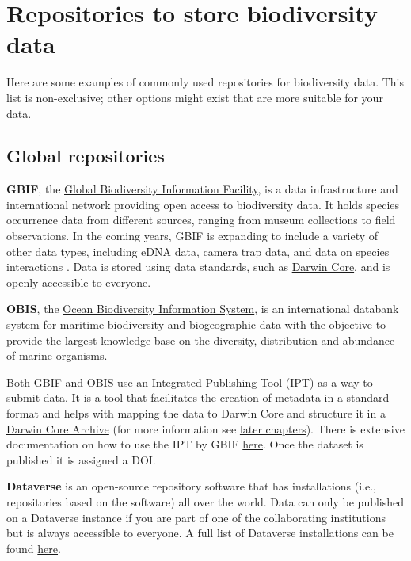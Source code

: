 \documentclass[
  oneside]{book}
\begin{document}
\section{Repositories to store biodiversity data}\label{repositories-to-store-biodiversity-data}

Here are some examples of commonly used repositories for biodiversity data. This list is non-exclusive; other options might exist that are more suitable for your data.

\subsection{Global repositories}\label{global-repositories}

\textbf{GBIF}, the \href{http://gbif.org}{Global Biodiversity Information Facility}, is a data infrastructure and international network providing open access to biodiversity data. It holds species occurrence data from different sources, ranging from museum collections to field observations. In the coming years, GBIF is expanding to include a variety of other data types, including eDNA data, camera trap data, and data on species interactions \autocite{GBIF_2021}. Data is stored using data standards, such as \hyperref[DwC]{Darwin Core}, and is openly accessible to everyone.

\textbf{OBIS}, the \href{https://obis.org/}{Ocean Biodiversity Information System}, is an international databank system for maritime biodiversity and biogeographic data with the objective to provide the largest knowledge base on the diversity, distribution and abundance of marine organisms.

Both GBIF and OBIS use an Integrated Publishing Tool (IPT) as a way to submit data. It is a tool that facilitates the creation of metadata in a standard format and helps with mapping the data to Darwin Core and structure it in a \hyperref[DwC-A]{Darwin Core Archive} (for more information see \hyperref[darwin-core-archive]{later chapters}). There is extensive documentation on how to use the IPT by GBIF \href{https://ipt.gbif.org/manual/en/ipt/latest/dwca-guide}{here}. Once the dataset is published it is assigned a DOI.

\textbf{Dataverse} is an open-source repository software that has installations (i.e., repositories based on the software) all over the world. Data can only be published on a Dataverse instance if you are part of one of the collaborating institutions but is always accessible to everyone. A full list of Dataverse installations can be found \href{https://dataverse.org/installations}{here}.
\end{document}
